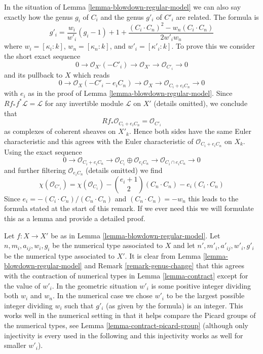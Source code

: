 \begin{remark}
\label{remark-genus-change}
In the situation of Lemma \ref{lemma-blowdown-regular-model}
we can also say exactly how the genus $g_i$ of $C_i$ and the genus
$g'_i$ of $C'_i$ are related. The formula is
$$
g'_i = \frac{w_i}{w'_i}(g_i - 1) + 1 +
\frac{(C_i \cdot C_n)^2 - w_n(C_i \cdot C_n)}{2w'_iw_n}
$$
where $w_i = [\kappa_i : k]$, $w_n = [\kappa_n : k]$, and
$w'_i = [\kappa'_i : k]$.
To prove this we consider the short exact sequence
$$
0 \to \mathcal{O}_{X'}(-C'_i) \to \mathcal{O}_{X'} \to
\mathcal{O}_{C'_i} \to 0
$$
and its pullback to $X$ which reads
$$
0 \to \mathcal{O}_X(-C'_i - e_iC_n) \to \mathcal{O}_X \to
\mathcal{O}_{C_i + e_i C_n} \to 0
$$
with $e_i$ as in the proof of Lemma \ref{lemma-blowdown-regular-model}.
Since $Rf_*f^*\mathcal{L} = \mathcal{L}$ for any invertible module
$\mathcal{L}$ on $X'$ (details omitted), we conclude that
$$
Rf_*\mathcal{O}_{C_i + e_i C_n} = \mathcal{O}_{C'_i}
$$
as complexes of coherent sheaves on $X'_k$.
Hence both sides have the same Euler characteristic and this
agrees with the Euler characteristic of $\mathcal{O}_{C_i + e_i C_n}$
on $X_k$. Using the exact sequence
$$
0 \to \mathcal{O}_{C_i + e_i C_n} \to
\mathcal{O}_{C_i} \oplus \mathcal{O}_{e_iC_n} \to
\mathcal{O}_{C_i \cap e_iC_n} \to 0
$$
and further filtering $\mathcal{O}_{e_iC_n}$ (details omitted) we find
$$
\chi(\mathcal{O}_{C'_i}) =
\chi(\mathcal{O}_{C_i}) - {e_i + 1 \choose 2}(C_n \cdot C_n)
- e_i(C_i \cdot C_n)
$$
Since $e_i = -(C_i \cdot C_n)/(C_n \cdot C_n)$ and
$(C_n \cdot C_n) = -w_n$ this leads to the formula
stated at the start of this remark. If we ever need
this we will formulate this as a lemma and
provide a detailed proof.
\end{remark}

\begin{remark}
\label{remark-compare-contractions}
Let $f : X \to X'$ be as in Lemma \ref{lemma-blowdown-regular-model}.
Let $n, m_i, a_{ij}, w_i, g_i$ be the numerical type associated to $X$ and
let $n', m'_i, a'_{ij}, w'_i, g'_i$ be the numerical type associated to $X'$.
It is clear from Lemma \ref{lemma-blowdown-regular-model} and
Remark \ref{remark-genus-change}
that this agrees with the contraction of numerical types in
Lemma \ref{lemma-contract}
except for the value of $w'_i$.
In the geometric situation $w'_i$ is some positive integer
dividing both $w_i$ and $w_n$. In the numerical case
we chose $w'_i$ to be the largest possible integer dividing
$w_i$ such that $g'_i$ (as given by the formula) is an integer.
This works well in the numerical setting
in that it helps compare the Picard groups
of the numerical types, see Lemma \ref{lemma-contract-picard-group}
(although only injectivity is every used in the following and this
injectivity works as well for smaller $w'_i$).
\end{remark}

